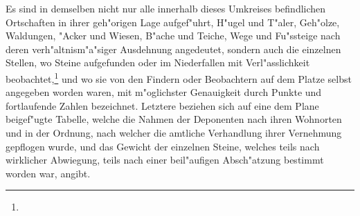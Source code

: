 \documentclass[a4paper, 11pt, oneside, german]{article}
\begin{document}
Es sind in demselben nicht nur alle innerhalb dieses Umkreises befindlichen Ortschaften in ihrer geh"origen Lage aufgef"uhrt, H"ugel und T"aler, Geh"olze, Waldungen, "Acker und Wiesen, B"ache und Teiche, Wege und Fu"ssteige nach deren verh"altnism"a"siger Ausdehnung angedeutet, sondern auch die einzelnen Stellen, wo Steine aufgefunden oder im Niederfallen mit Verl"asslichkeit beobachtet,\footnote{} und wo sie von den Findern oder Beobachtern auf dem Platze selbst angegeben worden waren, mit m"oglichster Genauigkeit durch Punkte und fortlaufende Zahlen bezeichnet. Letztere beziehen sich auf eine dem Plane beigef"ugte Tabelle, welche die Nahmen der Deponenten nach ihren Wohnorten und in der Ordnung, nach welcher die amtliche Verhandlung ihrer Vernehmung gepflogen wurde, und das Gewicht der einzelnen Steine, welches teils nach wirklicher Abwiegung, teils nach einer beil"aufigen Absch"atzung bestimmt worden war, angibt.
\end{document}
